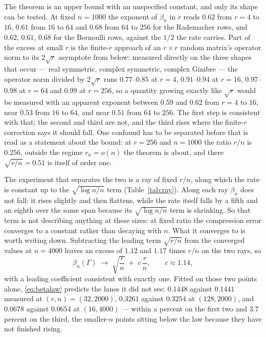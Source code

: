 \documentclass[11pt]{article}
\theoremstyle{definition}
\newcommand{\numExpBernA}{0.62}
\newcommand{\numExpBernB}{0.61}
\newcommand{\numExpBernC}{0.68}
\newcommand{\numExpRadA}{0.62}
\newcommand{\numExpRadB}{0.61}
\newcommand{\numExpRadC}{0.68}
\newcommand{\numRayC}{1.14}
\newcommand{\numRayMeasA}{0.1441}
\newcommand{\numRayMeasB}{0.3254}
\newcommand{\numRayMeasC}{0.0654}
\newcommand{\numRayOffC}{3.7}
\newcommand{\numRayPredA}{0.1448}
\newcommand{\numRayPredB}{0.3261}
\newcommand{\numRayPredC}{0.0678}
\begin{document}
The theorem is an upper bound with an unspecified constant, and only its shape can be tested. At
fixed $n=1000$ the exponent of $\beta_n$ in $r$ reads $\numExpRadA$ from $r=4$ to $16$,
$\numExpRadB$ from $16$ to $64$ and $\numExpRadC$ from $64$ to $256$ for the Rademacher rows, and
$\numExpBernA$, $\numExpBernB$, $\numExpBernC$ for the Bernoulli rows, against the $1/2$ the rate
carries. Part of the excess at small $r$ is the finite-$r$ approach of an $r\times r$ random matrix's
operator norm to its $2\sqrt r$ asymptote from below: measured directly on the three shapes that
occur --- real symmetric, complex symmetric, complex Ginibre --- the operator norm divided by
$2\sqrt r$ runs $0.77$--$0.85$ at $r=4$, $0.91$--$0.94$ at $r=16$, $0.97$--$0.98$ at $r=64$ and
$0.99$ at $r=256$, so a quantity growing exactly like $\sqrt r$ would be measured with an apparent
exponent between $0.59$ and $0.62$ from $r=4$ to $16$, near $0.53$ from $16$ to $64$, and near
$0.51$ from $64$ to $256$. The first step is consistent with that; the second and third are not, and
the third rises where the finite-$r$ correction says it should fall. One confound has to be separated
before that is read as a statement about the bound: at $r=256$ and $n=1000$ the ratio $r/n$ is
$0.256$, outside the regime $r_n=o(n)$ the theorem is about, and there $\sqrt{r/n}=0.51$ is itself of
order one.

The experiment that separates the two is a ray of fixed $r/n$, along which the rate is constant up to
the $\sqrt{\log n/n}$ term (Table~\ref{tab:ray}). Along each ray $\beta_n$ does not fall: it rises
slightly and then flattens, while the rate itself falls by a fifth and an eighth over the same span
because its $\sqrt{\log n/n}$ term is shrinking. So that term is not describing anything at these
sizes: at fixed ratio the compression error converges to a constant rather than decaying with $n$.
What it converges to is worth writing down. Subtracting the leading term $\sqrt{r/n}$ from the
converged values at $n=4000$ leaves an excess of $1.12$ and $1.17$ times $r/n$ on the two rays, so
\begin{equation}\label{eq:betalaw}
\beta_n(\Gamma)\;\longrightarrow\;\sqrt{\frac rn}\;+\;c\,\frac rn,\qquad c\approx\numRayC ,
\end{equation}
with a leading coefficient consistent with exactly one. Fitted on those two points alone,
\eqref{eq:betalaw} predicts the lanes it did not see: $\numRayPredA$ against $\numRayMeasA$
measured at $(r,n)=(32,2000)$, $\numRayPredB$ against $\numRayMeasB$ at $(128,2000)$, and
$\numRayPredC$ against $\numRayMeasC$ at $(16,4000)$ --- within a percent on the first two and
$\numRayOffC$ percent on the third, the smaller-$n$ points sitting below the law because they have
not finished rising.
\end{document}
